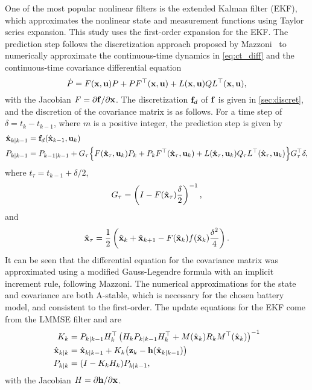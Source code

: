 \documentclass[../zhang_thesis.tex]{subfiles}
\begin{document}
One of the most popular nonlinear filters is the extended Kalman filter (EKF), which approximates the nonlinear state and measurement functions using Taylor series expansion. This study uses the first-order expansion for the EKF. The prediction step follows the discretization approach proposed by Mazzoni~\cite{mazzoni07} to numerically approximate the continuous-time dynamics in \cref{eq:ct_diff} and the continuous-time covariance differential equation
\begin{equation}
    \dot{P} = F(\mathbf{x},\mathbf{u}) P + P F^\top(\mathbf{x},\mathbf{u}) + L(\mathbf{x},\mathbf{u}) Q L^\top(\mathbf{x},\mathbf{u}),
\end{equation}
with the Jacobian $F=\partial\mathbf{f}/\partial\mathbf{x}$. The discretization $\mathbf{f}_d$ of $\mathbf{f}$ is given in \cref{sec:discret}, and the discretion of the covariance matrix is as follows. For a time step of $\delta=t_k-t_{k-1}$, where $m$ is a positive integer, the prediction step is given by
\begin{align}
    \hat{\mathbf{x}}_{k|k-1} &= \mathbf{f}_d(\hat{\mathbf{x}}_{k-1},\mathbf{u}_k) \label{eq:ekfpredx} \\
    P_{k|k-1} &= P_{k-1|k-1} + G_\tau \Big\{ F(\hat{\mathbf{x}}_\tau,\mathbf{u}_k) P_k + P_k F^\top(\hat{\mathbf{x}}_\tau,\mathbf{u}_k) + L(\hat{\mathbf{x}}_\tau,\mathbf{u}_k) Q_\tau L^\top(\hat{\mathbf{x}}_\tau,\mathbf{u}_k) \Big\} G_\tau^\top \delta, \label{eq:ekfpredz}
\end{align}
where $t_\tau = t_{k-1}+\delta/2$, 
\begin{equation}
    G_\tau = \left( I - F(\hat{\mathbf{x}}_\tau) \frac{\delta}{2} \right)^{-1},
\end{equation}
and
\begin{equation}
    \hat{\mathbf{x}}_\tau = \frac{1}{2} \left( \hat{\mathbf{x}}_k + \hat{\mathbf{x}}_{k+1} - F(\hat{\mathbf{x}}_k) f(\hat{\mathbf{x}}_k) \frac{\delta^2}{4} \right).
\end{equation}
It can be seen that the differential equation for the covariance matrix was approximated using a modified Gauss-Legendre formula with an implicit increment rule, following Mazzoni. The numerical approximations for the state and covariance are both A-stable, which is necessary for the chosen battery model, and consistent to the first-order. 
The update equations for the EKF come from the LMMSE filter and are
\begin{align}
    K_k &= P_{k|k-1} H_k^\top \left( H_k P_{k|k-1} H_k^\top + M(\hat{\mathbf{x}}_k) R_k M^\top(\hat{\mathbf{x}}_k) \right)^{-1} \\
    \hat{\mathbf{x}}_{k|k} &= \hat{\mathbf{x}}_{k|k-1} + K_k \big( \mathbf{z}_k - \mathbf{h}(\hat{\mathbf{x}}_{k|k-1}) \big) \\
    P_{k|k} &= (I - K_k H_k) P_{k|k-1}, \label{eq:ekf_l}
\end{align}
with the Jacobian $H=\partial\mathbf{h}/\partial\mathbf{x}$.
\end{document}

